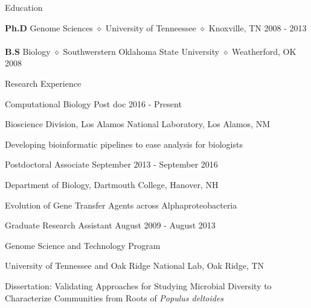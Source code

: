 \documentclass{resume} %
\begin{document}

\begin{rSection}{Education}

{\bf Ph.D} Genome Sciences {$\diamond$} University of Tenneessee {$\diamond$} Knoxville, TN \hfill {2008 - 2013} 
\\
\\
{\bf B.S}  Biology {$\diamond$} Southwerstern Oklahoma State University {$\diamond$}  Weatherford, OK \hfill{2008}
\end{rSection}



\begin{rSection}{Research Experience}
\begin{rSubsection}{Computational Biology Post doc} {2016 - Present}{}{}
\item Bioscience Division, Los Alamos National Laboratory, Los Alamos, NM
\item Developing bioinformatic pipelines to ease analysis for biologists
\end{rSubsection}

\begin{rSubsection}{Postdoctoral Associate} {September 2013 - September 2016}{}{}
\item Department of Biology, Dartmouth College, Hanover, NH
\item Evolution of Gene Transfer Agents across Alphaproteobacteria
\end{rSubsection}

\begin{rSubsection}{Graduate Research Assistant} {August 2009 - August 2013}{}{}
\item Genome Science and Technology Program
\item University of Tennessee and Oak Ridge National Lab, Oak Ridge, TN 
\item Dissertation: Validating Approaches for Studying Microbial Diversity to Characterize Communities from Roots of \textit{Populus deltoides}
\end{rSubsection}
\end{rSection}
\end{document}
